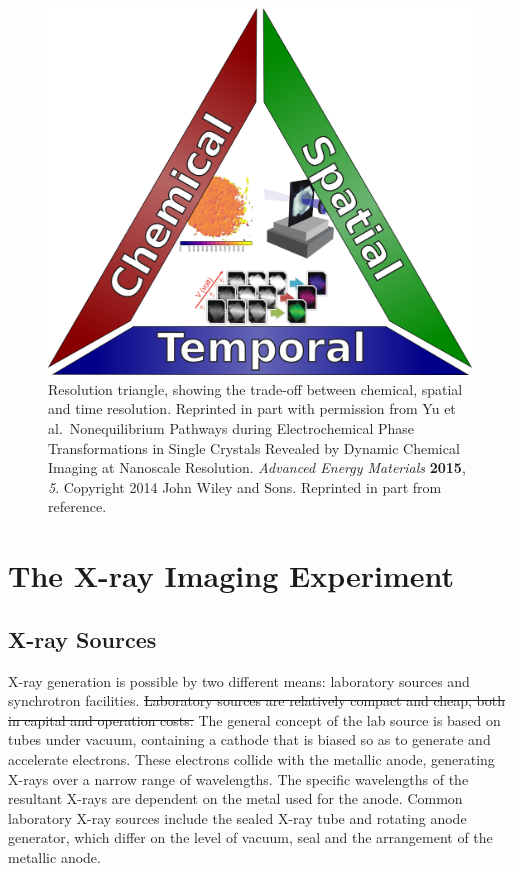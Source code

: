\documentclass[journal=cmatex,manuscript=perspective]{achemso}
\providecommand{\DIFdeltex}[1]{{\protect\color{red}\sout{#1}}}                      %
\providecommand{\DIFdelbegin}{} %
\providecommand{\DIFdelend}{} %
\providecommand{\DIFdel}[1]{\texorpdfstring{\DIFdeltex{#1}}{}} %
\begin{document}
\begin{figure}
  \includegraphics[width=\textwidth]{resolution-triangle.png}
  \caption{Resolution triangle, showing the trade-off between
    chemical, spatial and time resolution. Reprinted in part with
    permission from Yu et al.\ Nonequilibrium Pathways during
    Electrochemical Phase Transformations in Single Crystals Revealed
    by Dynamic Chemical Imaging at Nanoscale
    Resolution. \textit{Advanced Energy Materials} \textbf{2015},
    \textit{5}. Copyright 2014 John Wiley and Sons. Reprinted in part
    from reference\cite{shapiro2014}.}
  \label{figure:resolution-triangle}
\end{figure}

\section{The X-ray Imaging Experiment}

\subsection{X-ray Sources}

X-ray generation is possible by two different means: laboratory
sources and synchrotron facilities. \DIFdelbegin \DIFdel{Laboratory sources are relatively
compact and cheap, both in capital and operation costs. }\DIFdelend The general
concept of the lab source is based on tubes under vacuum, containing a
cathode that is biased so as to generate and accelerate
electrons. These electrons collide with the metallic anode, generating
X-rays over a narrow range of wavelengths. The specific wavelengths of
the resultant X-rays are dependent on the metal used for the
anode. Common laboratory X-ray sources include the sealed X-ray tube
and rotating anode generator, which differ on the level of vacuum,
seal and the arrangement of the metallic anode\cite{guinebretiere}.
\end{document}
